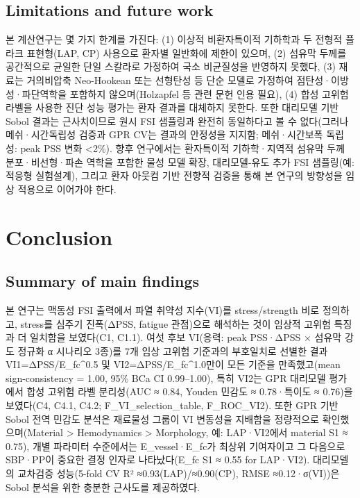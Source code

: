 \documentclass[preprint,12pt]{elsarticle}
\begin{document}
\subsection{Limitations and future work}
본 계산연구는 몇 가지 한계를 가진다: (1) 이상적 비환자특이적 기하학과 두 전형적 플라크 표현형(LAP, CP) 사용으로 환자별 일반화에 제한이 있으며, (2) 섬유막 두께를 공간적으로 균일한 단일 스칼라로 가정하여 국소 비균질성을 반영하지 못했다, (3) 재료는 거의비압축 Neo-Hookean 또는 선형탄성 등 단순 모델로 가정하여 점탄성·이방성·파단역학을 포함하지 않으며(Holzapfel 등 관련 문헌 인용 필요), (4) 합성 고위험 라벨을 사용한 진단 성능 평가는 환자 결과를 대체하지 못한다. 또한 대리모델 기반 Sobol 결과는 근사치이므로 원시 FSI 샘플링과 완전히 동일하다고 볼 수 없다(그러나 메쉬·시간독립성 검증과 GPR CV는 결과의 안정성을 지지함; 메쉬·시간보폭 독립성: peak PSS 변화 <2\%). 향후 연구에서는 환자특이적 기하학·지역적 섬유막 두께 분포·비선형·파손 역학을 포함한 물성 모델 확장, 대리모델-유도 추가 FSI 샘플링(예: 적응형 실험설계), 그리고 환자 아웃컴 기반 전향적 검증을 통해 본 연구의 방향성을 임상 적용으로 이어가야 한다.

\section{Conclusion}

\subsection{Summary of main findings}
본 연구는 맥동성 FSI 출력에서 파열 취약성 지수(VI)를 stress/strength 비로 정의하고, stress를 심주기 진폭(ΔPSS, fatigue 관점)으로 해석하는 것이 임상적 고위험 특징과 더 일치함을 보였다(C1, C1.1). 여섯 후보 VI(응력: peak PSS·ΔPSS × 섬유막 강도 정규화 α 시나리오 3종)를 7개 임상 고위험 기준과의 부호일치로 선별한 결과 VI1=ΔPSS/E\_fc\textasciicircum {0.5} 및 VI2=ΔPSS/E\_fc\textasciicircum {1.0}만이 모든 기준을 만족했고(mean sign-consistency = 1.00, 95\% BCa CI 0.99–1.00), 특히 VI2는 GPR 대리모델 평가에서 합성 고위험 라벨 분리성(AUC ≈ 0.84, Youden 민감도 ≈ 0.78·특이도 ≈ 0.76)을 보였다(C4, C4.1, C4.2; F\_VI\_selection\_table, F\_ROC\_VI2). 또한 GPR 기반 Sobol 전역 민감도 분석은 재료물성 그룹이 VI 변동성을 지배함을 정량적으로 확인했으며(Material > Hemodynamics > Morphology, 예: LAP·VI2에서 material S1 ≈ 0.75), 개별 파라미터 수준에서는 E\_vessel·E\_fc가 최상위 기여자이고 그 다음으로 SBP·PP이 중요한 결정 인자로 나타났다(E\_fc S1 ≈ 0.55 for LAP·VI2). 대리모델의 교차검증 성능(5-fold CV R² ≈0.93(LAP)/≈0.90(CP), RMSE ≈0.12·σ(VI))은 Sobol 분석을 위한 충분한 근사도를 제공하였다.
\end{document}
